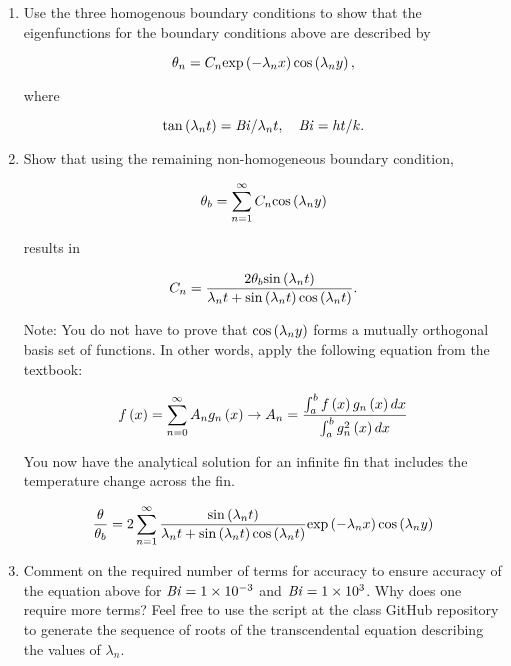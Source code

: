 \documentclass[12pt,letterpaper]{article}
\begin{document}
\begin{enumerate}
\begin{enumerate}
		\item Use the three homogenous boundary conditions to show that the eigenfunctions for the boundary conditions above are described by
			
			\begin{equation*}
				\theta_n = C_n \mathrm{exp} \left( - \lambda_n x \right) \mathrm{cos} \left( \lambda_n y \right),
			\end{equation*}
			
			where
			
			\begin{equation*}
				\mathrm{tan} \left( \lambda_n t \right) = \mathit{Bi} / \lambda_n t, \quad \mathit{Bi}= h t / k .
			\end{equation*}
		
		\item Show that using the remaining non-homogeneous boundary condition,
		
			\begin{equation*}
				\theta_b = \sum_{n = 1}^\infty C_n \mathrm{cos} \left( \lambda_n y \right)
			\end{equation*}
			
			results in
			
			\begin{equation*}
				C_n = \frac{2 \theta_b \mathrm{sin} \left( \lambda_n t \right)}{\lambda_n t + \mathrm{sin} \left( \lambda_n t \right) \mathrm{cos} \left( \lambda_n t \right)}.
			\end{equation*}
			
			Note: You do not have to prove that $\mathrm{cos} \left( \lambda_n y \right)$ forms a mutually orthogonal basis set of functions.
			In other words, apply the following equation from the textbook:
			
			\begin{equation*}
				f \left( x \right) = \sum_{n = 0}^{\infty} A_n g_n \left( x \right) \to A_n = \frac{\int_a^b f \left( x \right) g_n \left( x \right) d x}{\int_a^b g_n^2 \left( x \right) d x}
			\end{equation*}
			
			You now have the analytical solution for an infinite fin that includes the temperature change across the fin.
			
			\begin{equation*}
				\frac{\theta}{\theta_b} = 2 \sum_{n=1}^{\infty} \frac{\mathrm{sin} \left( \lambda_n t \right)}{\lambda_n t + \mathrm{sin} \left( \lambda_n t \right) \mathrm{cos} \left( \lambda_n t \right)} \mathrm{exp} \left( - \lambda_n x \right) \mathrm{cos} \left( \lambda_n y \right)
			\end{equation*}
		
		\item Comment on the required number of terms for accuracy to ensure accuracy of the equation above for $\mathit{Bi} = 1 \times 10^{-3}$ and $\mathit{Bi} = 1 \times 10^3$.
		Why does one require more terms?
		Feel free to use the script at the class GitHub repository to generate the sequence of roots of the transcendental equation describing the values of $\lambda_n$.
		

\end{enumerate}
\end{enumerate}
\end{document}
